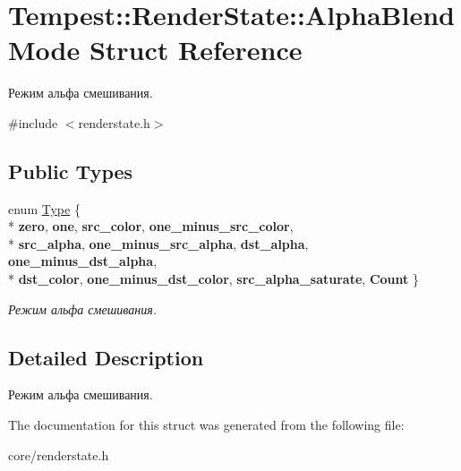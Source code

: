 \hypertarget{struct_tempest_1_1_render_state_1_1_alpha_blend_mode}{\section{Tempest\+:\+:Render\+State\+:\+:Alpha\+Blend\+Mode Struct Reference}
\label{struct_tempest_1_1_render_state_1_1_alpha_blend_mode}
}


Режим альфа смешивания.  




{\ttfamily \#include $<$renderstate.\+h$>$}

\subsection*{Public Types}
\begin{DoxyCompactItemize}
\item 
\hypertarget{struct_tempest_1_1_render_state_1_1_alpha_blend_mode_afc2bd577f22a371d7b8d953e43b2ac07}{enum \hyperlink{struct_tempest_1_1_render_state_1_1_alpha_blend_mode_afc2bd577f22a371d7b8d953e43b2ac07}{Type} \{ \\*
{\bfseries zero}, 
{\bfseries one}, 
{\bfseries src\+\_\+color}, 
{\bfseries one\+\_\+minus\+\_\+src\+\_\+color}, 
\\*
{\bfseries src\+\_\+alpha}, 
{\bfseries one\+\_\+minus\+\_\+src\+\_\+alpha}, 
{\bfseries dst\+\_\+alpha}, 
{\bfseries one\+\_\+minus\+\_\+dst\+\_\+alpha}, 
\\*
{\bfseries dst\+\_\+color}, 
{\bfseries one\+\_\+minus\+\_\+dst\+\_\+color}, 
{\bfseries src\+\_\+alpha\+\_\+saturate}, 
{\bfseries Count}
 \}}\label{struct_tempest_1_1_render_state_1_1_alpha_blend_mode_afc2bd577f22a371d7b8d953e43b2ac07}

\begin{DoxyCompactList}\small\item\em Режим альфа смешивания. \end{DoxyCompactList}\end{DoxyCompactItemize}


\subsection{Detailed Description}
Режим альфа смешивания. 

The documentation for this struct was generated from the following file\+:\begin{DoxyCompactItemize}
\item 
core/renderstate.\+h\end{DoxyCompactItemize}
